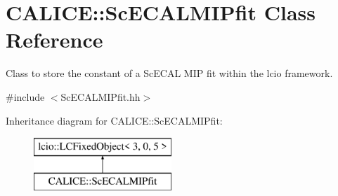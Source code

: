 \section{C\-A\-L\-I\-C\-E\-:\-:Sc\-E\-C\-A\-L\-M\-I\-Pfit Class Reference}
\label{classCALICE_1_1ScECALMIPfit}


Class to store the constant of a Sc\-E\-C\-A\-L M\-I\-P fit within the lcio framework.  




{\ttfamily \#include $<$Sc\-E\-C\-A\-L\-M\-I\-Pfit.\-hh$>$}

Inheritance diagram for C\-A\-L\-I\-C\-E\-:\-:Sc\-E\-C\-A\-L\-M\-I\-Pfit\-:\begin{figure}[H]
\begin{center}
\leavevmode
\includegraphics[height=2.000000cm]{classCALICE_1_1ScECALMIPfit}
\end{center}
\end{figure}
